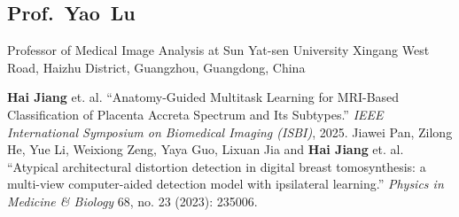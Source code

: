 \documentclass[11pt,a4paper, final]{moderncv}
\newcommand{\spacesubsection}{\vspace{0.2cm}}
\begin{document}
	\subsection{\textbf{Prof.~Yao~Lu}}
		\cvline{}
		{Professor of Medical Image Analysis at Sun Yat-sen University}
		{Xingang West Road, Haizhu District, Guangzhou, Guangdong, China}





{}
\nocite{*}

	\begin{thebibliography}{99}
		\bibitem[1]{} 
					\textbf{Hai Jiang} et. al. 
					``Anatomy-Guided Multitask Learning for MRI-Based Classification of Placenta Accreta Spectrum and Its Subtypes.'' 
					\emph{IEEE International Symposium on Biomedical Imaging (ISBI)}, 2025.
		\bibitem[2]{} 
					Jiawei Pan, Zilong He, Yue Li, Weixiong Zeng, Yaya Guo, Lixuan Jia and \textbf{Hai Jiang} et. al. 
					``Atypical architectural distortion detection in digital breast tomosynthesis: a multi-view computer-aided detection model with ipsilateral learning.'' 
					\emph{Physics in Medicine \& Biology} 68, no. 23 (2023): 235006.
	\end{thebibliography}
% 
\end{document}
